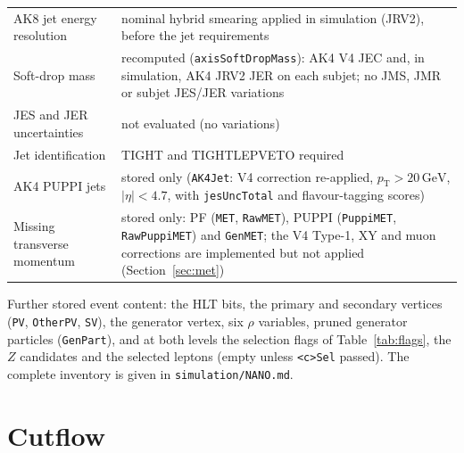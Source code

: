 \documentclass[11pt]{article}
\newcommand{\pt}{p_{\mathrm{T}}}
\newcommand{\GeV}{\ensuremath{\,\mathrm{GeV}}}
\newcommand{\code}[1]{\texttt{#1}}
\begin{document}
\begin{table}[htbp]
\begin{tabularx}{\textwidth}{>{\raggedright\arraybackslash}p{4.2cm}>{\raggedright\arraybackslash}X}
AK8 jet energy resolution & nominal hybrid smearing applied in simulation (JRV2), before the jet
  requirements~\cite{JMEjerc} \\
Soft-drop mass & recomputed (\code{axisSoftDropMass}): AK4 V4 JEC and, in simulation, AK4 JRV2 JER on each subjet; no
  JMS, JMR or subjet JES/JER variations \\
JES and JER uncertainties & not evaluated (no variations) \\
Jet identification & TIGHT and TIGHTLEPVETO required~\cite{JMEjetid} \\
AK4 PUPPI jets & stored only (\code{AK4Jet}: V4 correction re-applied, $\pt > 20\GeV$, $|\eta| < 4.7$, with
  \code{jesUncTotal} and flavour-tagging scores) \\
Missing transverse momentum & stored only: PF (\code{MET}, \code{RawMET}), PUPPI (\code{PuppiMET},
  \code{RawPuppiMET}) and \code{GenMET}; the V4 Type-1, XY and muon corrections are implemented but not applied
  (Section~\ref{sec:met}) \\
\bottomrule
\end{tabularx}
\end{table}

Further stored event content: the HLT bits, the primary and secondary vertices (\code{PV}, \code{OtherPV}, \code{SV}),
the generator vertex, six $\rho$ variables, pruned generator particles (\code{GenPart}), and at both levels the
selection flags of Table~\ref{tab:flags}, the $Z$ candidates and the selected leptons (empty unless \code{<c>Sel} passed).
The complete inventory is given in \code{simulation/NANO.md}.

\section{Cutflow}
\label{sec:cutflow}
\end{document}
